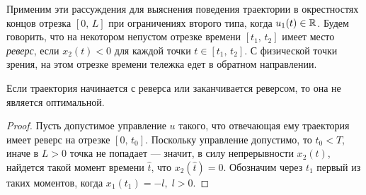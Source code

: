Применим эти рассуждения для выяснения поведения траектории в окрестностях концов отрезка $[0,\,L]$ при ограничениях второго типа, когда $u_1(t) \in \mathbb{R}$. Будем говорить, что на некотором непустом отрезке времени $[t_1,\,t_2]$ имеет место \textit{реверс}, если $x_2(t) < 0$ для каждой точки $t \in [t_1,\,t_2]$. С физической точки зрения, на этом отрезке времени тележка едет в обратном направлении.

\begin{assertion}
Если траектория начинается с реверса или заканчивается реверсом, то она не является оптимальной.
\end{assertion}
\begin{proof}
        Пусть допустимое управление $u$ такого, что отвечающая ему траектория имеет реверс на отрезке $[0,\,t_0]$. Поскольку управление допустимо, то $t_0 < T$, иначе в $L > 0$ точка не попадает --- значит, в силу непрерывности $x_2(t)$, найдется такой момент времени $\hat t$, что $x_2(\hat t) = 0$. Обозначим через $t_1$ первый из таких моментов, когда $x_1(t_1)=-l,\;l>0$. 
\end{proof}